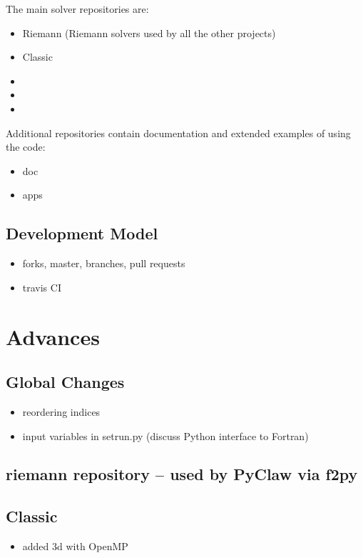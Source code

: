 \documentclass[]{siamltex}
\begin{document}
The main solver repositories are:
\begin{itemize}
    \item Riemann (Riemann solvers used by all the other projects)
    \item Classic
    \item \amrclaw
    \item \geoclaw
    \item \pyclaw
\end{itemize}

Additional repositories contain documentation and extended examples of using the code:
\begin{itemize}
    \item doc
    \item apps
\end{itemize}

\subsection{Development Model}
\begin{itemize}
    \item forks, master, branches, pull requests
    \item travis CI
\end{itemize}

\section{Advances}
\subsection{Global Changes}
\begin{itemize}
    \item reordering indices
    \item input variables in setrun.py (discuss Python interface to Fortran)
\end{itemize}

\subsection{riemann repository -- used by PyClaw via f2py}

\subsection{Classic}
\begin{itemize}
    \item added 3d with OpenMP
\end{itemize}
\end{document}
